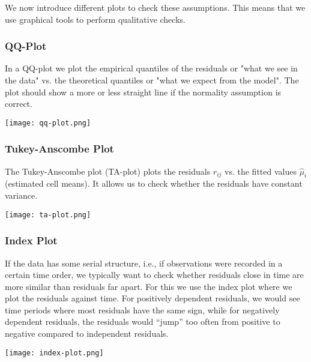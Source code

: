 We now introduce different plots to check these assumptions. This means that we use graphical tools to perform qualitative checks.

\subsubsection{QQ-Plot}

In a QQ-plot we plot the empirical quantiles of the residuals or "what we see in the data" vs. the theoretical quantiles or "what we expect from the model". The plot should show a more or less straight line if the normality assumption is correct.
\\[-20pt]
\begin{center}
	\texttt{[image: qq-plot.png]}
\end{center}

\subsubsection{Tukey-Anscombe Plot}

The Tukey-Anscombe plot (TA-plot) plots the residuals $r_{ij}$ vs. the fitted values $\hat \mu_i$ (estimated cell means). It allows us to check whether the residuals have constant variance.
\begin{center}
	\texttt{[image: ta-plot.png]}
\end{center}

\subsubsection{Index Plot}

If the data has some serial structure, i.e., if observations were recorded in a certain time order, we typically want to check whether residuals close in time are more similar than residuals far apart. For this we use the index plot where we plot the residuals against time. For positively dependent residuals, we would see time periods where most residuals have the same sign, while for negatively dependent residuals, the residuals would “jump” too often from positive to negative compared to independent residuals. 
\begin{center}
	\texttt{[image: index-plot.png]}
\end{center}



